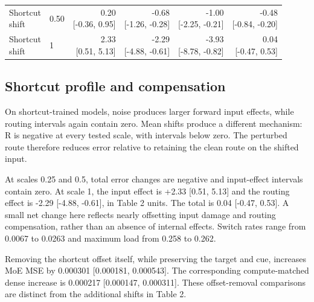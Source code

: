\documentclass[10pt,letterpaper]{article}
\begin{document}
\begin{table}[!htbp]
{\begin{tabular}{@{}llrrrr@{}}
\makecell[l]{Shortcut\\shift} & 0.50 & \makecell[r]{0.20\\{}[-0.36, 0.95]} & \makecell[r]{-0.68\\{}[-1.26, -0.28]} & \makecell[r]{-1.00\\{}[-2.25, -0.21]} & \makecell[r]{-0.48\\{}[-0.84, -0.20]} \\
\makecell[l]{Shortcut\\shift} & 1 & \makecell[r]{2.33\\{}[0.51, 5.13]} & \makecell[r]{-2.29\\{}[-4.88, -0.61]} & \makecell[r]{-3.93\\{}[-8.78, -0.82]} & \makecell[r]{0.04\\{}[-0.47, 0.53]} \\
\bottomrule
\end{tabular}}
\ifdim\wd\reporttablebox>\linewidth
\resizebox{\linewidth}{!}{\usebox{\reporttablebox}}
\else\usebox{\reporttablebox}\fi
\end{table}


\subsection{Shortcut profile and compensation}

On shortcut-trained models, noise produces larger forward input effects, while routing intervals again contain zero. Mean shifts produce a different mechanism: R is negative at every tested scale, with intervals below zero. The perturbed route therefore reduces error relative to retaining the clean route on the shifted input.


At scales 0.25 and 0.5, total error changes are negative and input-effect intervals contain zero. At scale 1, the input effect is +2.33 [0.51, 5.13] and the routing effect is -2.29 [-4.88, -0.61], in Table 2 units. The total is 0.04 [-0.47, 0.53]. A small net change here reflects nearly offsetting input damage and routing compensation, rather than an absence of internal effects. Switch rates range from 0.0067 to 0.0263 and maximum load from 0.258 to 0.262.


Removing the shortcut offset itself, while preserving the target and cue, increases MoE MSE by 0.000301 [0.000181, 0.000543]. The corresponding compute-matched dense increase is 0.000217 [0.000147, 0.000311]. These offset-removal comparisons are distinct from the additional shifts in Table 2.
\end{document}
